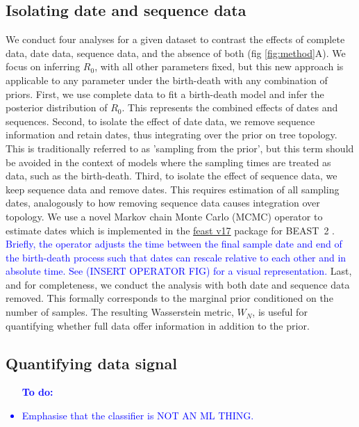 \documentclass{article}
\begin{document}
\subsection*{Isolating date and sequence data}
We conduct four analyses for a given dataset to contrast the effects of complete data, date data, sequence data, and the absence of both (fig \ref{fig:method}A). We focus on inferring $R_{0}$, with all other parameters fixed, but this new approach is applicable to any parameter under the birth-death with any combination of priors. First, we use complete data to fit a birth-death model and infer the posterior distribution of $R_{0}$. This represents the combined effects of dates and sequences. Second, to isolate the effect of date data, we remove sequence information and retain dates, thus integrating over the prior on tree topology. This is traditionally referred to as 'sampling from the prior', but this term should be avoided in the context of models where the sampling times are treated as data, such as the birth-death. Third, to isolate the effect of sequence data, we keep sequence data and remove dates. This requires estimation of all sampling dates, analogously to how removing sequence data causes integration over topology. We use a novel Markov chain Monte Carlo (MCMC) operator to estimate dates which is implemented in the \href{https://github.com/tgvaughan/feast}{feast v17} package for BEAST~2 \citep{bouckaert_beast_2019}. \textcolor{blue}{Briefly, the operator adjusts the time between the final sample date and end of the birth-death process such that dates can rescale relative to each other and in absolute time. See (INSERT OPERATOR FIG) for a visual representation.} Last, and for completeness, we conduct the analysis with both date and sequence data removed. This formally corresponds to the marginal prior conditioned on the number of samples. The resulting Wasserstein metric, $W_N$, is useful for quantifying whether full data offer information in addition to the prior.
\subsection*{Quantifying data signal}

\textcolor{blue}{\begin{itemize}
    \item [\textbf{To do:}]
    \item Emphasise that the classifier is NOT AN ML THING.
\end{itemize}}
\end{document}

